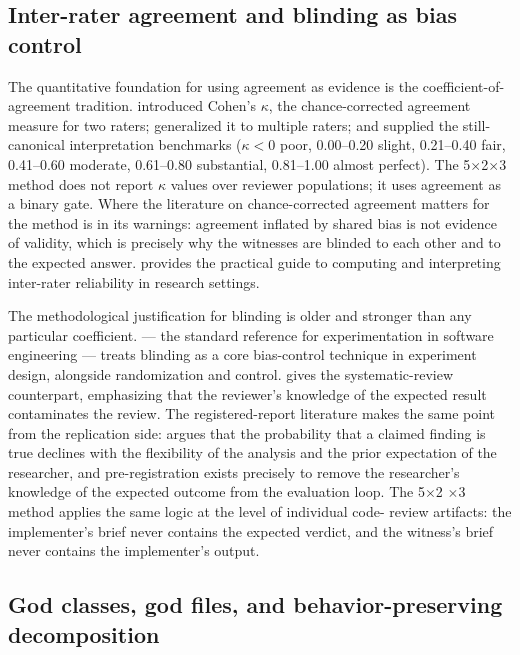 \documentclass[11pt]{article}
\theoremstyle{definition}
\theoremstyle{plain}
\theoremstyle{remark}
\begin{document}
\subsection{Inter-rater agreement and blinding as bias control}

The quantitative foundation for using agreement as evidence is the
coefficient-of-agreement tradition. \citet{cohen1960} introduced Cohen's
$\kappa$, the chance-corrected agreement measure for two raters;
\citet{fleiss1971} generalized it to multiple raters; and
\citet{landis1977} supplied the still-canonical interpretation benchmarks
($\kappa < 0$ poor, 0.00--0.20 slight, 0.21--0.40 fair, 0.41--0.60
moderate, 0.61--0.80 substantial, 0.81--1.00 almost perfect). The
5$\times$2$\times$3 method does not report $\kappa$ values over reviewer
populations; it uses agreement as a binary gate. Where the literature on
chance-corrected agreement matters for the method is in its warnings:
agreement inflated by shared bias is not evidence of validity, which is
precisely why the witnesses are blinded to each other and to the expected
answer. \citet{hallgren2012} provides the practical guide to computing and
interpreting inter-rater reliability in research settings.

The methodological justification for blinding is older and stronger than any
particular coefficient. \citet{wohlin2012} --- the standard reference for
experimentation in software engineering --- treats blinding as a core
bias-control technique in experiment design, alongside randomization and
control. \citet{kitchenham2009} gives the systematic-review counterpart,
emphasizing that the reviewer's knowledge of the expected result contaminates
the review. The registered-report literature makes the same point from the
replication side: \citet{ioannidis2005} argues that the probability that a
claimed finding is true declines with the flexibility of the analysis and the
prior expectation of the researcher, and pre-registration
\citep{nosek2018,chambers2013} exists precisely to remove the researcher's
knowledge of the expected outcome from the evaluation loop. The 5$\times$2
$\times$3 method applies the same logic at the level of individual code-
review artifacts: the implementer's brief never contains the expected
verdict, and the witness's brief never contains the implementer's output.

\subsection{God classes, god files, and behavior-preserving decomposition}
\end{document}
